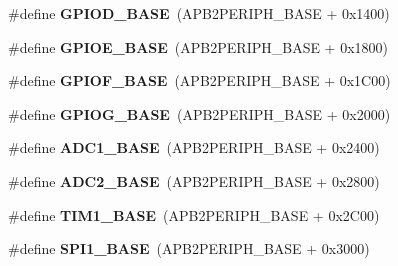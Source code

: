 \begin{DoxyCompactItemize}
\item 
\hypertarget{group___peripheral__memory__map_ga1a93ab27129f04064089616910c296ec}{\#define {\bfseries G\-P\-I\-O\-D\-\_\-\-B\-A\-S\-E}~(A\-P\-B2\-P\-E\-R\-I\-P\-H\-\_\-\-B\-A\-S\-E + 0x1400)}\label{group___peripheral__memory__map_ga1a93ab27129f04064089616910c296ec}

\item 
\hypertarget{group___peripheral__memory__map_gab487b1983d936c4fee3e9e88b95aad9d}{\#define {\bfseries G\-P\-I\-O\-E\-\_\-\-B\-A\-S\-E}~(A\-P\-B2\-P\-E\-R\-I\-P\-H\-\_\-\-B\-A\-S\-E + 0x1800)}\label{group___peripheral__memory__map_gab487b1983d936c4fee3e9e88b95aad9d}

\item 
\hypertarget{group___peripheral__memory__map_ga7f9a3f4223a1a784af464a114978d26e}{\#define {\bfseries G\-P\-I\-O\-F\-\_\-\-B\-A\-S\-E}~(A\-P\-B2\-P\-E\-R\-I\-P\-H\-\_\-\-B\-A\-S\-E + 0x1\-C00)}\label{group___peripheral__memory__map_ga7f9a3f4223a1a784af464a114978d26e}

\item 
\hypertarget{group___peripheral__memory__map_ga5d8ca4020f2e8c00bde974e8e7c13cfe}{\#define {\bfseries G\-P\-I\-O\-G\-\_\-\-B\-A\-S\-E}~(A\-P\-B2\-P\-E\-R\-I\-P\-H\-\_\-\-B\-A\-S\-E + 0x2000)}\label{group___peripheral__memory__map_ga5d8ca4020f2e8c00bde974e8e7c13cfe}

\item 
\hypertarget{group___peripheral__memory__map_ga695c9a2f892363a1c942405c8d351b91}{\#define {\bfseries A\-D\-C1\-\_\-\-B\-A\-S\-E}~(A\-P\-B2\-P\-E\-R\-I\-P\-H\-\_\-\-B\-A\-S\-E + 0x2400)}\label{group___peripheral__memory__map_ga695c9a2f892363a1c942405c8d351b91}

\item 
\hypertarget{group___peripheral__memory__map_ga6544abc57f9759f610eee09a02442ae6}{\#define {\bfseries A\-D\-C2\-\_\-\-B\-A\-S\-E}~(A\-P\-B2\-P\-E\-R\-I\-P\-H\-\_\-\-B\-A\-S\-E + 0x2800)}\label{group___peripheral__memory__map_ga6544abc57f9759f610eee09a02442ae6}

\item 
\hypertarget{group___peripheral__memory__map_gaf8aa324ca5011b8173ab16585ed7324a}{\#define {\bfseries T\-I\-M1\-\_\-\-B\-A\-S\-E}~(A\-P\-B2\-P\-E\-R\-I\-P\-H\-\_\-\-B\-A\-S\-E + 0x2\-C00)}\label{group___peripheral__memory__map_gaf8aa324ca5011b8173ab16585ed7324a}

\item 
\hypertarget{group___peripheral__memory__map_ga50cd8b47929f18b05efbd0f41253bf8d}{\#define {\bfseries S\-P\-I1\-\_\-\-B\-A\-S\-E}~(A\-P\-B2\-P\-E\-R\-I\-P\-H\-\_\-\-B\-A\-S\-E + 0x3000)}\label{group___peripheral__memory__map_ga50cd8b47929f18b05efbd0f41253bf8d}


\end{DoxyCompactItemize}
